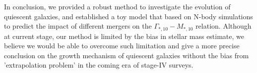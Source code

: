 \documentclass[fleqn,usenatbib]{mnras}
\begin{document}
\par In conclusion, we provided a robust method to investigate the evolution of quiescent galaxies, and established a toy model that based on N-body simulations to predict the impact of different mergers on the $\Gamma_{*,10} - M_{*,10}$ relation. Although at current stage, our method is limited by the bias in stellar mass estimate, we believe we would be able to overcome such limitation and give a more precise conclusion on the growth mechanism of quiescent galaxies without the bias from 'extrapolation problem' in the coming era of stage-IV surveys. 
\end{document}
